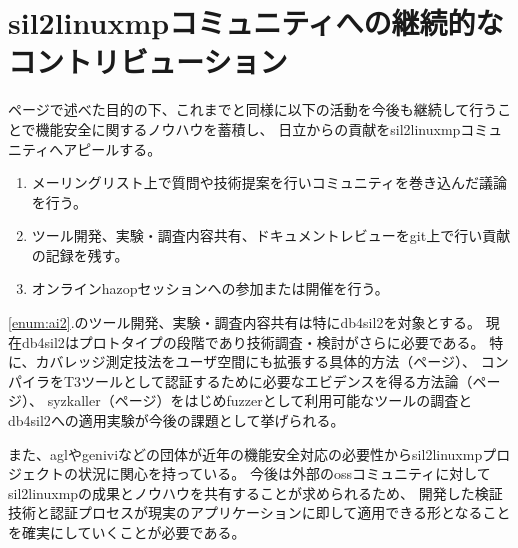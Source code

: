 \section{\acrshort{sil2linuxmp}コミュニティへの継続的なコントリビューション}
\pageref{contribution}ページで述べた目的の下、これまでと同様に以下の活動を今後も継続して行うことで機能安全に関するノウハウを蓄積し、
日立からの貢献を\acrshort{sil2linuxmp}コミュニティへアピールする。
\begin{enumerate}
  \item メーリングリスト上で質問や技術提案を行いコミュニティを巻き込んだ議論を行う。 \label{enum:ai1}
  \item ツール開発、実験・調査内容共有、ドキュメントレビューを\acrshort{git}上で行い貢献の記録を残す。 \label{enum:ai2}
  \item オンライン\acrshort{hazop}セッションへの参加または開催を行う。\label{enum:ai3}
\end{enumerate}
\ref{enum:ai2}.のツール開発、実験・調査内容共有は特に\acrshort{db4sil2}を対象とする。
現在\acrshort{db4sil2}はプロトタイプの段階であり技術調査・検討がさらに必要である。
特に、カバレッジ測定技法をユーザ空間にも拡張する具体的方法（\pageref{callgraph}ページ）、
コンパイラをT3ツールとして認証するために必要なエビデンスを得る方法論（\pageref{compveri}ページ）、
\acrshort{syzkaller}（\pageref{syzkaller}ページ）をはじめ\acrshort{fuzzer}として利用可能なツールの調査と\acrshort{db4sil2}への適用実験が今後の課題として挙げられる。
\par
また、\gls{agl}や\acrshort{genivi}などの団体が近年の機能安全対応の必要性から\acrshort{sil2linuxmp}プロジェクトの状況に関心を持っている。
今後は外部の\acrshort{oss}コミュニティに対して\acrshort{sil2linuxmp}の成果とノウハウを共有することが求められるため、
開発した検証技術と認証プロセスが現実のアプリケーションに即して適用できる形となることを確実にしていくことが必要である。
